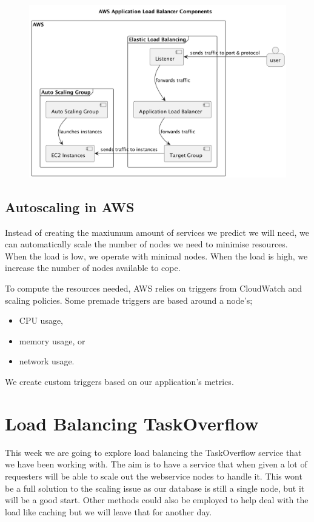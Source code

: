 \documentclass{csse4400}
\begin{document}
\begin{figure}[H]
  \includegraphics[width=\textwidth]{diagrams/loadbalancers}
\end{figure}

\subsection{Autoscaling in AWS}
Instead of creating the maxiumum amount of services we predict we will need,
we can automatically scale the number of nodes we need to minimise resources.
When the load is low, we operate with minimal nodes.
When the load is high, we increase the number of nodes available to cope.

To compute the resources needed, AWS relies on triggers from CloudWatch and scaling policies.
Some premade triggers are based around a node's;

\begin{itemize}
    \item CPU usage,
    \item memory usage, or 
    \item network usage.
\end{itemize}

We create custom triggers based on our application's metrics.

\section{Load Balancing TaskOverflow}

This week we are going to explore load balancing the TaskOverflow service that we have been working with. The aim is to have a service that when given a lot of requesters will be able to scale out the webservice nodes to handle it. This wont be a full solution to the scaling issue as our database is still a single node, but it will be a good start. Other methods could also be employed to help deal with the load like caching but we will leave that for another day.
\end{document}

